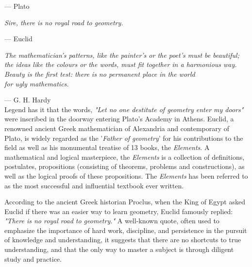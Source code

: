 \documentclass[twoside,11pt]{report}
\begin{document}
\hspace{16em} --- Plato

\hfill

\begin{center}
  \textit{Sire, there is no royal road to geometry.}

  \hspace{10.5em}--- Euclid
\end{center}

\hfill

\begin{flushright}
  \textit{The mathematician's patterns, like the painter's or the poet's must be beautiful;}
  \textit{the ideas like the colours or the words, must fit together in a harmonious way.}
  \textit{Beauty is the first test: there is no permanent place in the world}\\
  \textit{for ugly mathematics.}
\end{flushright}

\hfill --- G. H. Hardy\\

Legend has it that the words, \textit{"Let no one destitute of geometry enter my doors"} were inscribed in the doorway entering Plato's Academy in Athens.  Euclid, a renowned ancient Greek mathematician of Alexandria and contemporary of Plato, is widely regarded as the '\textit{Father of geometry}' for his contributions to the field as well as his monumental treatise of 13 books, the \textit{Elements}.  A mathematical and logical masterpiece, the \textit{Elements} is a collection of definitions, postulates, propositions (consisting of theorems, problems and constructions), as well as the logical proofs of these propositions.  The \textit{Elements} has been referred to as the most successful and influential textbook ever written.

According to the ancient Greek historian Proclus, when the King of Egypt asked Euclid if there was an easier way to learn geometry, Euclid famously replied: \textit{"There is no royal road to geometry."} A well-known quote, often used to emphasize the importance of hard work, discipline, and persistence in the pursuit of knowledge and understanding, it suggests that there are no shortcuts to true understanding, and that the only way to master a subject is through diligent study and practice.
\end{document}

